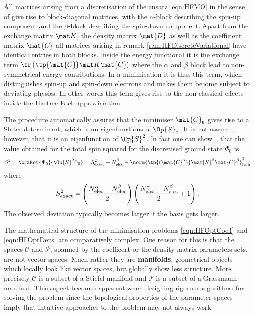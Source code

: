 \begin{rem}
	All matrices arising from a discretisation of the \HF ansatz \eqref{eqn:HFMO}
	in the sense of \UHF give rise to block-diagonal matrices,
	with the $\alpha$-block describing the
	spin-up component
	and the $\beta$-block describing the spin-down component.
	Apart from the exchange matrix $\matK$,
	the density matrix $\mat{D}$ as well as the coefficient matrix $\mat{C}$
	all matrices arising in remark \ref{rem:HFDiscreteVariational}
	have identical entries in both blocks.
	Inside the \HF energy functional
	it is the exchange term $\tr \left(\tp{\mat{C}} \matK \mat{C}\right)$
	where the $\alpha$ and $\beta$ block lead to non-symmetrical
	energy contributions.
	In a minimisation it is thus this term, which distinguishes
	spin-up and spin-down electrons and makes them become subject to deviating physics.
	In other words this term gives rise to the non-classical effects
	inside the Hartree-Fock approximation.

	The \UHF procedure automatically assures that the minimiser $\mat{C}_0$
	gives rise to a Slater determinant,
	which is an eigenfunctions of $\Op{S}_z$.
	It is not assured, however, that it is an eigenfunction of $\Op{S}^2$.
	In fact one can show~\cite{Szabo1996},
	that the value obtained for the total spin squared
	for the discretised \HF ground state $\Phi_0$ is
	\begin{equation}
		\label{eqn:UHFS2}
		S^2 = \braket{\Phi_0}{\Op{S}^2 \Phi_0}
		=
		S^2_\text{exact} + \NelecB -
		\norm{
		\tp{\left(\mat{C}^\alpha\right)} \mat{S}^\beta \mat{C}^\beta
		}_\text{frob}^2
	\end{equation}
	where
	\[ S^2_\text{exact}
		= \left(\frac{N_\text{elec}^\alpha - N_\text{elec}^\beta}{2}\right)
			\left(\frac{N_\text{elec}^\alpha - N_\text{elec}^\beta}{2} +1\right).
	\]
	The observed deviation typically becomes larger if the basis gets larger.

	The mathematical structure of the minimisation problems
	\eqref{eqn:HFOptCoeff} and \eqref{eqn:HFOptDens} are comparatively complex.
	One reason for this is that the spaces $\mathcal{C}$ and $\mathcal{P}$,
	spanned by the coefficent or the density matrix parameters sets,
	are not vector spaces.
	Much rather they are \textbf{manifolds},
	\ie geometrical objects which locally look like vector spaces,
	but globally show less structure.
	More precisely $\mathcal{C}$ is a subset of a Stiefel manifold
	and $\mathcal{P}$ is a subset of a Grassmann manifold.
	This aspect becomes apparent
	when designing rigorous algorithms for solving the \HF problem
	since the
	topological properties of the \HF parameter spaces
	imply that intuitive approaches to the problem may not always work.
\end{rem}

